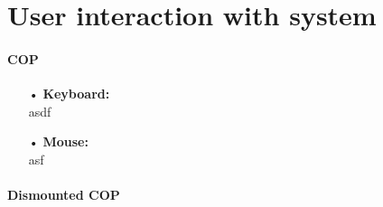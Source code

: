 \section{User interaction with system}

\paragraph{COP}
\begin{enumerate}
\item[•] \textbf{Keyboard:}\\
asdf
\item[•] \textbf{Mouse:}\\
asf

\end{enumerate}


\paragraph{Dismounted COP}

